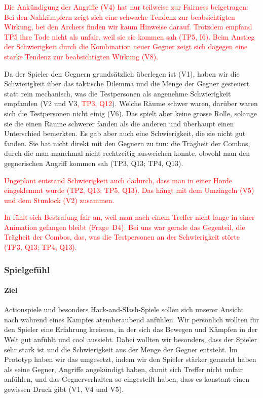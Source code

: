 \documentclass[../Main.tex]{subfiles}
\begin{document}
\textcolor{red}{Die Ankündigung der Angriffe (V4) hat nur teilweise zur Fairness beigetragen: Bei den Nahkämpfern zeigt sich eine schwache Tendenz zur beabsichtigten Wirkung, bei den Archers finden wir kaum Hinweise darauf. Trotzdem empfand TP5 ihre Tode nicht als unfair, weil sie sie kommen sah (TP5, I6). Beim Anstieg der Schwierigkeit durch die Kombination neuer Gegner zeigt sich dagegen eine starke Tendenz zur beabsichtigten Wirkung (V8).}

Da der Spieler den Gegnern grundsätzlich überlegen ist (V1), haben wir die Schwierigkeit über das taktische Dilemma und die Menge der Gegner gesteuert statt rein mechanisch, was die Testpersonen als angenehme Schwierigkeit empfanden (V2 und V3\textcolor{red}{, TP3, Q12}). Welche Räume schwer waren, darüber waren sich die Testpersonen nicht einig (V6). Das spielt aber keine grosse Rolle, solange sie die einen Räume schwerer fanden als die anderen und überhaupt einen Unterschied bemerkten. Es gab aber auch eine Schwierigkeit, die sie nicht gut fanden. Sie hat nicht direkt mit den Gegnern zu tun: die Trägheit der Combos, durch die man manchmal nicht rechtzeitig ausweichen konnte, obwohl man den gegnerischen Angriff kommen sah (TP3, Q13; TP4, Q13).

\textcolor{red}{Ungeplant entstand Schwierigkeit auch dadurch, dass man in einer Horde eingeklemmt wurde (TP2, Q13; TP5, Q13). Das hängt mit dem Umzingeln (V5) und dem Stunlock (V2) zusammen.}

\textcolor{red}{In  fühlt sich Bestrafung fair an, weil man nach einem Treffer nicht lange in einer Animation gefangen bleibt (Frage~D4). Bei uns war gerade das Gegenteil, die Trägheit der Combos, das, was die Testpersonen an der Schwierigkeit störte (TP3, Q13; TP4, Q13).}

\subsubsection{Spielgefühl}

\paragraph{Ziel}
Actionspiele und besonders Hack-and-Slash-Spiele sollen sich unserer Ansicht nach während eines Kampfes atemberaubend anfühlen. Wir persönlich wollten für den Spieler eine Erfahrung kreieren, in der sich das Bewegen und Kämpfen in der Welt gut anfühlt und cool aussieht. Dabei wollten wir besonders, dass der Spieler sehr stark ist und die Schwierigkeit aus der Menge der Gegner entsteht. Im Prototyp haben wir das umgesetzt, indem wir den Spieler stärker gemacht haben als seine Gegner, Angriffe angekündigt haben, damit sich Treffer nicht unfair anfühlen, und das Gegnerverhalten so eingestellt haben, dass es konstant einen gewissen Druck gibt (V1, V4 und V5).
\end{document}
